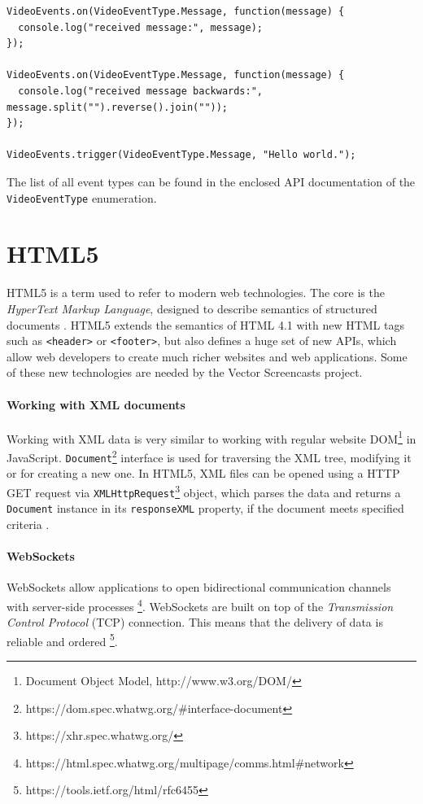 \begin{lstlisting}
VideoEvents.on(VideoEventType.Message, function(message) {
  console.log("received message:", message);
});

VideoEvents.on(VideoEventType.Message, function(message) {
  console.log("received message backwards:", message.split("").reverse().join(""));
});

VideoEvents.trigger(VideoEventType.Message, "Hello world.");

\end{lstlisting}

The list of all event types can be found in the enclosed API documentation of the \verb|VideoEventType| enumeration.


\section{HTML5}

HTML5 is a term used to refer to modern web technologies. The core is the \textit{HyperText Markup Language}, designed to describe semantics of structured documents \cite{html5}. HTML5 extends the semantics of HTML 4.1 with new HTML tags such as \verb|<header>| or \verb|<footer>|, but also defines a huge set of new APIs, which allow web developers to create much richer websites and web applications. Some of these new technologies are needed by the Vector Screencasts project.

\paragraph{Working with XML documents}
Working with XML data is very similar to working with regular website DOM\footnote{Document Object Model, http://www.w3.org/DOM/} in JavaScript. \verb|Document|\footnote{https://dom.spec.whatwg.org/\#interface-document} interface is used for traversing the XML tree, modifying it or for creating a new one. In HTML5, XML files can be opened using a HTTP GET request via \verb|XMLHttpRequest|\footnote{https://xhr.spec.whatwg.org/} object, which parses the data and returns a \verb|Document| instance in its \verb|responseXML| property, if the document meets specified criteria \cite{xhr}.

\paragraph{WebSockets}
WebSockets allow applications to open bidirectional communication channels with server-side processes \cite{}\footnote{https://html.spec.whatwg.org/multipage/comms.html\#network}. WebSockets are built on top of the \textit{Transmission Control Protocol} (TCP) connection. This means that the delivery of data is reliable and ordered \cite{}\footnote{https://tools.ietf.org/html/rfc6455}.

